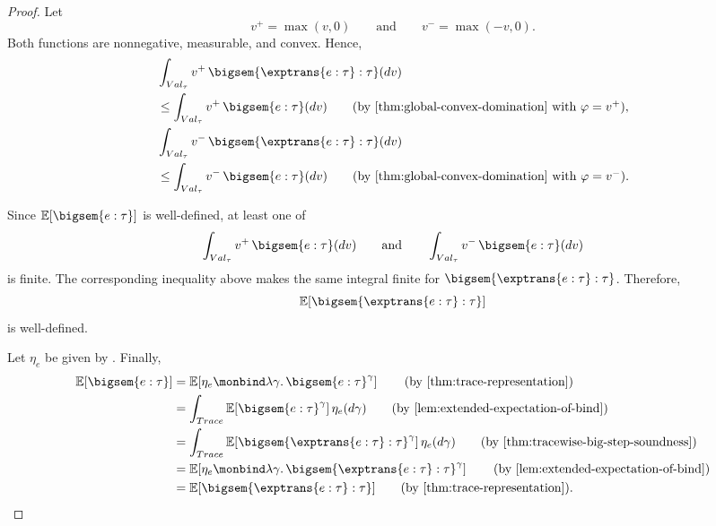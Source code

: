 \begin{proof}
  Let
  \[
    v^+=\max(v,0)
    \qquad\text{and}\qquad
    v^-=\max(-v,0).
  \]
  Both functions are nonnegative, measurable, and convex. Hence,
  \begin{align}
    &\int_{Val_\tau}
      v^+\,
      \bigsem{\exptrans{e:\tau}:\tau}(dv)
    \notag
    \\
    &\leq
    \int_{Val_\tau}
      v^+\,
      \bigsem{e:\tau}(dv)
    \tag{\text{by \Cref{thm:global-convex-domination} with $\varphi=v^+$}},
    \\
    &\int_{Val_\tau}
      v^-\,
      \bigsem{\exptrans{e:\tau}:\tau}(dv)
    \notag
    \\
    &\leq
    \int_{Val_\tau}
      v^-\,
      \bigsem{e:\tau}(dv)
    \tag{\text{by \Cref{thm:global-convex-domination} with $\varphi=v^-$}}.
  \end{align}

  Since $\mathbb E[\bigsem{e:\tau}]$ is well-defined, at least one of
  \[
    \int_{Val_\tau}v^+\,\bigsem{e:\tau}(dv)
    \qquad\text{and}\qquad
    \int_{Val_\tau}v^-\,\bigsem{e:\tau}(dv)
  \]
  is finite. The corresponding inequality above makes the same integral
  finite for $\bigsem{\exptrans{e:\tau}:\tau}$. Therefore,
  \[
    \mathbb E[\bigsem{\exptrans{e:\tau}:\tau}]
  \]
  is well-defined.

  Let $\eta_e$ be given by . Finally,
  \begin{align}
    \mathbb E[\bigsem{e:\tau}]
    &=
    \mathbb E\!\left[
      \eta_e
      \monbind
      \lambda\gamma.\,
      \bigsem{e:\tau}^{\gamma}
    \right]
    \tag{\text{by \Cref{thm:trace-representation}}}
    \\
    &=
    \int_{Trace}
      \mathbb E\!\left[
        \bigsem{e:\tau}^{\gamma}
      \right]
      \eta_e(d\gamma)
    \tag{\text{by \Cref{lem:extended-expectation-of-bind}}}
    \\
    &=
    \int_{Trace}
      \mathbb E\!\left[
        \bigsem{\exptrans{e:\tau}:\tau}^{\gamma}
      \right]
      \eta_e(d\gamma)
    \tag{\text{by \Cref{thm:tracewise-big-step-soundness}}}
    \\
    &=
    \mathbb E\!\left[
      \eta_e
      \monbind
      \lambda\gamma.\,
      \bigsem{\exptrans{e:\tau}:\tau}^{\gamma}
    \right]
    \tag{\text{by \Cref{lem:extended-expectation-of-bind}}}
    \\
    &=
    \mathbb E[\bigsem{\exptrans{e:\tau}:\tau}]
    \tag{\text{by \Cref{thm:trace-representation}}}.
  \end{align}
\end{proof}
